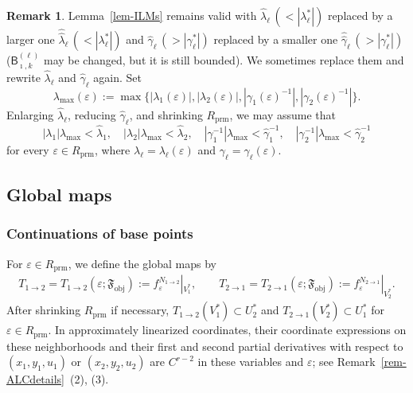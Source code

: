 \documentclass[11pt,a4paper]{article}
\theoremstyle{plain}
\theoremstyle{definition}
\newtheorem{remark}[theorem]{Remark}
\theoremstyle{plain}
\numberwithin{equation}{section}
\begin{document}
\begin{remark}
\label{rem-hatssm}
Lemma~\ref{lem-ILMs} remains valid with $\widehat{\lambda}_\ell \, (< |\lambda_\ell^*|)$ replaced by a larger one $\widehat{\widehat{\lambda}}_\ell \, (< |\lambda_\ell^*|)$ and $\widehat{\gamma}_\ell \, (> |\gamma_\ell^*|)$ replaced by a smaller one $\widehat{\widehat{\gamma}}_\ell \, (> |\gamma_\ell^*|)$ ($\mathsf{B}_{\imath,k}^{(\ell)}$ may be changed, but it is still bounded). We sometimes replace them and rewrite $\widehat{\lambda}_\ell$ and $\widehat{\gamma}_\ell$ again. Set
\[
\lambda_\mathrm{max}(\varepsilon)
:=
\max\{|\lambda_1(\varepsilon)|,|\lambda_2(\varepsilon)|,|\gamma_1(\varepsilon)^{-1}|,|\gamma_2(\varepsilon)^{-1}|\}.
\]
Enlarging $\widehat{\lambda}_\ell$, reducing $\widehat{\gamma}_\ell$, and shrinking $R_\mathrm{prm}$, we may assume that
\begin{equation}
\label{eq-hineq}
|\lambda_1| \lambda_\mathrm{max} < \widehat{\lambda}_1,\quad
|\lambda_2| \lambda_\mathrm{max} < \widehat{\lambda}_2,\quad
|\gamma_1^{-1}| \lambda_\mathrm{max} < \widehat{\gamma}_1^{-1},\quad
|\gamma_2^{-1}| \lambda_\mathrm{max} < \widehat{\gamma}_2^{-1}
\end{equation}
for every $\varepsilon \in R_\mathrm{prm}$, where $\lambda_\ell = \lambda_\ell(\varepsilon)$ and $\gamma_\ell = \gamma_\ell(\varepsilon)$.
\end{remark}
\subsection{Global maps}

\subsubsection{Continuations of base points}

For $\varepsilon \in R_\mathrm{prm}$, we define the global maps by
\begin{align*}
T_{1 \to 2} = T_{1 \to 2}(\varepsilon; \mathfrak{F}_\mathrm{obj}) := f_\varepsilon^{N_{1 \to 2}}|_{V_1^*},
\qquad
T_{2 \to 1} = T_{2 \to 1}(\varepsilon; \mathfrak{F}_\mathrm{obj}) := f_\varepsilon^{N_{2 \to 1}}|_{V_2^*}.
\end{align*}
After shrinking $R_\mathrm{prm}$ if necessary, $T_{1 \to 2}(V_1^*) \subset U_2^*$ and $T_{2 \to 1}(V_2^*) \subset U_1^*$ for $\varepsilon \in R_\mathrm{prm}$. In approximately linearized coordinates, their coordinate expressions on these neighborhoods and their first and second partial derivatives with respect to $(x_1,y_1,u_1)$ or $(x_2,y_2,u_2)$ are $C^{r-2}$ in these variables and $\varepsilon$; see Remark~\ref{rem-ALCdetails}~(2), (3).
\end{document}
